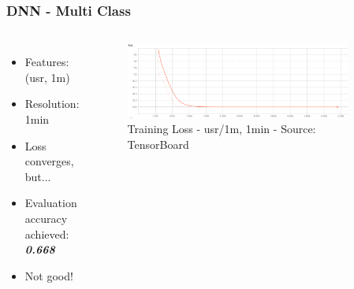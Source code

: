 \documentclass[aspectratio=169,11pt,hyperref={colorlinks=true}]{beamer}
\begin{document}
\begin{frame}
    \frametitle{DNN - Multi Class}
    \begin{columns}
        \begin{itemize}
          \item{Features: (usr, 1m)}
          \item{Resolution: 1min}
          \item{Loss converges, but...}
          \item{Evaluation accuracy achieved: \emph{\textbf{0.668}}}
          \item{Not good!}
        \end{itemize}
        \begin{figure}
          \begin{center}
            \includegraphics[width=0.9\textwidth,height=0.5\textheight]{graphs/cpu_1m-1min-node_provider_all_loss_curve.png}
              \caption{Training Loss - usr/1m, 1min - Source: TensorBoard}
          \end{center}
        \end{figure}
      \end{columns}
\end{frame}
\end{document}
